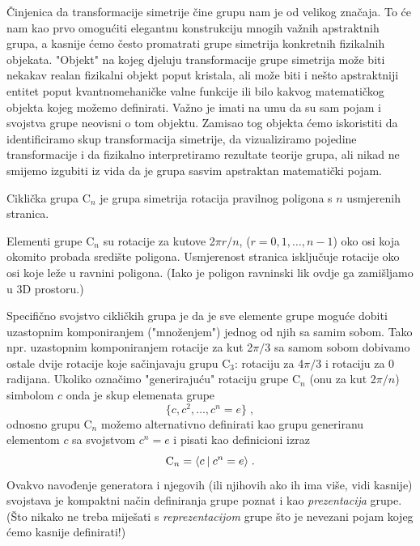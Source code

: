 Činjenica da transformacije simetrije čine grupu nam je od velikog
značaja. To će nam kao prvo omogućiti elegantnu konstrukciju mnogih važnih
apstraktnih grupa, a kasnije ćemo često promatrati grupe simetrija konkretnih fizikalnih
objekata.
"Objekt" na kojeg djeluju transformacije grupe simetrija može biti
nekakav realan fizikalni objekt poput kristala, ali može biti i
nešto apstraktniji entitet poput kvantnomehaničke valne funkcije
ili bilo kakvog matematičkog objekta kojeg možemo definirati.
Važno je imati na umu da su sam pojam i svojstva grupe neovisni o
tom objektu. Zamisao tog objekta ćemo iskoristiti da identificiramo skup transformacija
simetrije, da vizualiziramo pojedine transformacije i da
fizikalno interpretiramo rezultate teorije grupa, ali nikad
ne smijemo izgubiti iz vida da je grupa sasvim apstraktan matematički pojam.


\begin{primjer} 
Ciklička grupa C$_n$ je grupa simetrija rotacija pravilnog poligona s $n$
usmjerenih stranica.
\end{primjer}

\centerline{}

Elementi grupe C$_n$ su rotacije za kutove 2$\pi r/n$, ($r=0,1,\ldots, n-1$)
oko osi koja okomito probada središte poligona. Usmjerenost
stranica isključuje rotacije oko osi koje leže u ravnini poligona. 
(Iako je poligon ravninski lik ovdje ga zamišljamo u 3D prostoru.)

Specifično svojstvo cikličkih grupa je da je sve elemente grupe moguće
dobiti uzastopnim komponiranjem ("množenjem") jednog od njih sa samim sobom.
Tako npr. uzastopnim komponiranjem rotacije za kut 2$\pi/3$ sa samom sobom dobivamo ostale
dvije rotacije koje sačinjavaju grupu C$_3$: rotaciju za 4$\pi/3$ i
rotaciju za 0 radijana. 
Ukoliko označimo "generirajuću" rotaciju grupe C$_n$ (onu za kut 2$\pi/n$)
simbolom $c$ onda je skup elemenata grupe
\begin{equation}
 \{c,c^2, \ldots , c^n=e \} \;,
\label{eq:cn}
\end{equation}
odnosno grupu C$_n$ možemo alternativno definirati kao grupu generiranu
elementom $c$ sa svojstvom $c^n=e$ i pisati kao definicioni izraz
\begin{equation}
 {\rm C}_n = \langle c \: | \: c^n=e \rangle \;.
\label{eq:cngp}
\end{equation}
Ovakvo navođenje generatora i njegovih (ili njihovih ako ih ima više, vidi kasnije)
svojstava je kompaktni način definiranja grupe poznat i kao \emph{prezentacija}
grupe. (Što nikako ne treba miješati s \emph{reprezentacijom} grupe što je nevezani
pojam kojeg ćemo kasnije definirati!)

